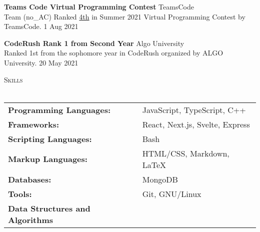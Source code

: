 \documentclass[a4paper]{article}
\newcommand{\lineunder} {
    \vspace*{-8pt} \\
    \hspace*{-18pt} \hrulefill \\
}
\newcommand{\header} [1] {
    {\hspace*{-18pt}\vspace*{6pt} \textsc{#1}}
    \vspace*{-6pt} \lineunder
}
\begin{document}
\textbf{Teams Code Virtual Programming Contest} \hfill TeamsCode\\
Team (no\_AC) Ranked \href{https://youtu.be/eCylTCHctY0?t=16137}{4th} in Summer 2021 Virtual Programming Contest by TeamsCode. \hfill 1 Aug 2021\\
\vspace*{1mm}

\textbf{CodeRush Rank 1 from Second Year} \hfill Algo University\\
Ranked 1st from the sophomore year in CodeRush organized by ALGO University. \hfill 20 May 2021\\
\vspace*{1.5mm}



\header{Skills}
\vspace{1mm}
\begin{tabular}{ l l }
	\textbf{Programming Languages:} & JavaScript, TypeScript, C++ \\
	\textbf{Frameworks:} & React, Next.js, Svelte, Express \\
	\textbf{Scripting Languages:} & Bash \\
	\textbf{Markup Languages:} & HTML/CSS, Markdown, \LaTeX \\
	\textbf{Databases:} & MongoDB \\
	\textbf{Tools:} & Git, GNU/Linux \\
	\textbf{Data Structures and Algorithms} \\
\end{tabular}
\vspace{1.5mm}
\end{document}

